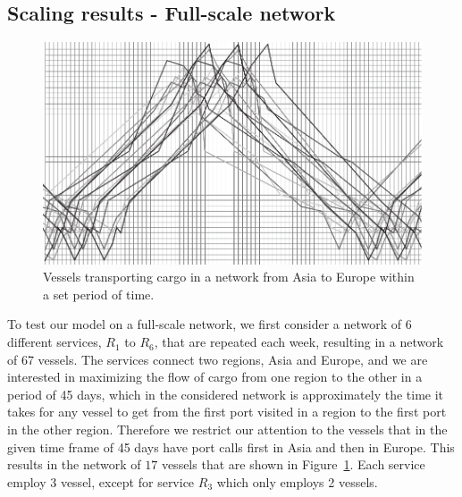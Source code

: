 \subsection{Scaling results - Full-scale network}
\begin{figure}[pos=htbp]
	\centering
		\includegraphics{figures/fewerBW.pdf}
	\caption{Vessels transporting cargo in a network from Asia to Europe within a set period of time.}
	\label{fig:full}
\end{figure}

\noindent To test our model on a full-scale network, we first consider a network of 6 different services, $R_1$ to $R_6$, that are repeated each week, resulting in a network of 67 vessels. The services connect two regions, Asia and Europe, and we are interested in maximizing the flow of cargo from one region to the other in a period of 45 days, which in the considered network is approximately the time it takes for any vessel to get from the first port visited in a region to the first port in the other region. Therefore we restrict our attention to the vessels that in the given time frame of 45 days have port calls first in Asia and then in Europe. This results in the network of $17$ vessels that are shown in Figure~\ref{fig:full}. Each service employ 3 vessel, except for service $R_3$ which only employs 2 vessels.

